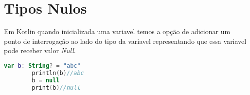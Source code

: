 \section{Tipos Nulos}
Em Kotlin quando inicializada uma variavel
    temos a opção de adicionar um ponto de interrogação
    ao lado do tipo da variavel representando que essa variavel pode
    receber valor \emph{Null}.
    
    \begin{lstlisting}[label={lst:example1}, language=Kotlin]
        var b: String? = "abc" 
        println(b)//abc
        b = null
        print(b)//null
    \end{lstlisting}

